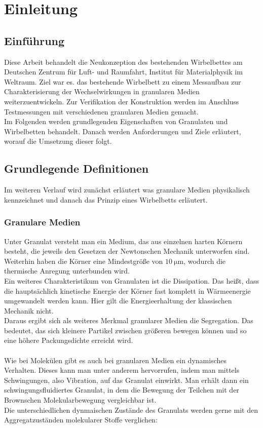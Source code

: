 \chapter{Einleitung}


\section{Einführung}

Diese Arbeit behandelt die Neukonzeption des bestehenden Wirbelbettes am Deutschen Zentrum für Luft- und Raumfahrt, Institut für Materialphysik im Weltraum. Ziel war es. das bestehende Wirbelbett zu einem Messaufbau zur Charakterisierung der Wechselwirkungen in granularen Medien weiterzuentwickeln. Zur Verifikation der Konstruktion werden im Anschluss Testmessungen mit verschiedenen granularen Medien gemacht. \\
Im Folgenden werden grundlegenden Eigenschaften von Granulaten und Wirbelbetten behandelt. Danach werden Anforderungen und Ziele erläutert, worauf die Umsetzung dieser folgt.


\section{Grundlegende Definitionen}

Im weiteren Verlauf wird zunächst erläutert was granulare Medien physikalisch kennzeichnet und danach das Prinzip eines Wirbelbetts erläutert.

\subsection{Granulare Medien}

Unter Granulat versteht man ein Medium, das aus einzelnen harten Körnern besteht, die jeweils den Gesetzen der Newtonschen Mechanik unterworfen sind. Weiterhin haben die Körner eine Mindestgröße von $\SI{10}{\micro\meter}$, wodurch die thermische Anregung unterbunden wird. \\
Ein weiteres Charakteristikum von Granulaten ist die Dissipation. Das heißt, dass die hauptsächlich kinetische Energie der Körner fast komplett in Wärmeenergie umgewandelt werden kann. Hier gilt die Energieerhaltung der klassischen Mechanik nicht. \cite{DLRWebsite} \\
Daraus ergibt sich als weiteres Merkmal granularer Medien die Segregation. Das bedeutet, das sich kleinere Partikel zwischen größeren bewegen können und so eine höhere Packungsdichte erreicht wird. \cite{PhysikimKontext} \\
\hfill \\ 
Wie bei Molekülen gibt es auch bei granularen Medien ein dynamisches Verhalten. Dieses kann man unter anderem hervorrufen, indem man mittels Schwingungen, also Vibration, auf das Granulat einwirkt. Man erhält dann ein schwingungsfluidiertes Granulat, in dem die Bewegung der Teilchen mit der Brownschen Molekularbewegung vergleichbar ist. \\
Die unterschiedlichen dynmaischen Zustände des Granulats werden gerne mit den Aggregatzuständen molekularer Stoffe verglichen:


